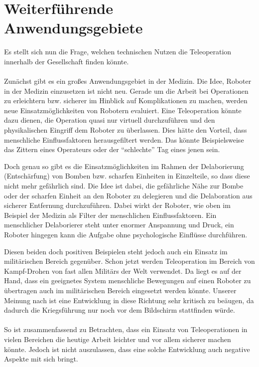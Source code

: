 \section{Weiterführende Anwendungsgebiete}
Es stellt sich nun die Frage, welchen technischen Nutzen die Teleoperation innerhalb der Gesellschaft finden könnte.
\\
\\
\noindent
Zunächst gibt es ein großes Anwendungsgebiet in der Medizin. Die Idee, Roboter in der Medizin einzusetzen ist nicht neu. Gerade um die Arbeit bei Operationen zu erleichtern bzw. sicherer im Hinblick auf Komplikationen zu machen, werden neue Einsatzmöglichkeiten von Robotern evaluiert. Eine Teleoperation könnte dazu dienen, die Operation quasi nur virtuell durchzuführen und den physikalischen Eingriff dem Roboter zu überlassen. Dies hätte den Vorteil, dass menschliche Einflussfaktoren herausgefiltert werden. Das könnte Beispielsweise das Zittern eines Operateurs oder der "`schlechte"' Tag eines jenen sein.

Doch genau so gibt es die Einsatzmöglichkeiten im Rahmen der Delaborierung (Entschärfung) von Bomben bzw. scharfen Einheiten in Einzelteile, so dass diese nicht mehr gefährlich sind. Die Idee ist dabei, die gefährliche Nähe zur Bombe oder der scharfen Einheit an den Roboter zu delegieren und die Delaboration aus sicherer Entfernung durchzuführen. Dabei wirkt der Roboter, wie oben im Beispiel der Medizin als Filter der menschlichen Einflussfaktoren. Ein menschlicher Delaborierer steht unter enormer Anspannung und Druck, ein Roboter hingegen kann die Aufgabe ohne psychologische Einflüsse durchführen. 

Diesen beiden doch positiven Beispielen steht jedoch auch ein Einsatz im militärischen Bereich gegenüber. Schon jetzt werden Teleoperation im Bereich von Kampf-Drohen von fast allen Militärs der Welt verwendet. Da liegt es auf der Hand, dass ein geeignetes System menschliche Bewegungen auf einen Roboter zu übertragen auch im militärischen Bereich eingesetzt werden könnte. Unserer Meinung nach ist eine Entwicklung in diese Richtung sehr kritisch zu beäugen, da dadurch die Kriegsführung nur noch vor dem Bildschirm stattfinden würde.
\\
\\
\noindent
So ist zusammenfassend zu Betrachten, dass ein Einsatz von Teleoperationen in vielen Bereichen die heutige Arbeit leichter und vor allem sicherer machen könnte. Jedoch ist nicht auszulassen, dass eine solche Entwicklung auch negative Aspekte mit sich bringt.

